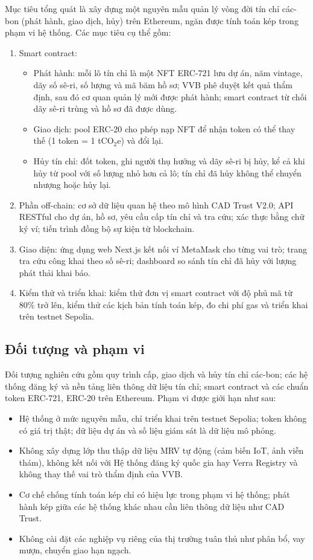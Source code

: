 Mục tiêu tổng quát là xây dựng một nguyên mẫu quản lý vòng đời tín chỉ các-bon (phát hành, giao dịch, hủy) trên Ethereum, ngăn được tính toán kép trong phạm vi hệ thống. Các mục tiêu cụ thể gồm:
\begin{enumerate}
    \item Smart contract:
    \begin{itemize}
        \item Phát hành: mỗi lô tín chỉ là một NFT ERC-721 lưu dự án, năm vintage, dãy số sê-ri, số lượng và mã băm hồ sơ; VVB phê duyệt kết quả thẩm định, sau đó cơ quan quản lý mới được phát hành; smart contract từ chối dãy sê-ri trùng và hồ sơ đã được dùng.
        \item Giao dịch: pool ERC-20 cho phép nạp NFT để nhận token có thể thay thế (1 token = 1 tCO$_2$e) và đổi lại.
        \item Hủy tín chỉ: đốt token, ghi người thụ hưởng và dãy sê-ri bị hủy, kể cả khi hủy từ pool với số lượng nhỏ hơn cả lô; tín chỉ đã hủy không thể chuyển nhượng hoặc hủy lại.
    \end{itemize}
    \item Phần off-chain: cơ sở dữ liệu quan hệ theo mô hình CAD Trust V2.0; API RESTful cho dự án, hồ sơ, yêu cầu cấp tín chỉ và tra cứu; xác thực bằng chữ ký ví; tiến trình đồng bộ sự kiện từ blockchain.
    \item Giao diện: ứng dụng web Next.js kết nối ví MetaMask cho từng vai trò; trang tra cứu công khai theo số sê-ri; dashboard so sánh tín chỉ đã hủy với lượng phát thải khai báo.
    \item Kiểm thử và triển khai: kiểm thử đơn vị smart contract với độ phủ mã từ 80\% trở lên, kiểm thử các kịch bản tính toán kép, đo chi phí gas và triển khai trên testnet Sepolia.
\end{enumerate}

\subsection*{Đối tượng và phạm vi}
\label{subsec:phamvi}

Đối tượng nghiên cứu gồm quy trình cấp, giao dịch và hủy tín chỉ các-bon; các hệ thống đăng ký và nền tảng liên thông dữ liệu tín chỉ; smart contract và các chuẩn token ERC-721, ERC-20 trên Ethereum. Phạm vi được giới hạn như sau:
\begin{itemize}
    \item Hệ thống ở mức nguyên mẫu, chỉ triển khai trên testnet Sepolia; token không có giá trị thật; dữ liệu dự án và số liệu giám sát là dữ liệu mô phỏng.
    \item Không xây dựng lớp thu thập dữ liệu MRV tự động (cảm biến IoT, ảnh viễn thám), không kết nối với Hệ thống đăng ký quốc gia hay Verra Registry và không thay thế vai trò thẩm định của VVB.
    \item Cơ chế chống tính toán kép chỉ có hiệu lực trong phạm vi hệ thống; phát hành kép giữa các hệ thống khác nhau cần liên thông dữ liệu như CAD Trust.
    \item Không cài đặt các nghiệp vụ riêng của thị trường tuân thủ như phân bổ, vay mượn, chuyển giao hạn ngạch.
\end{itemize}

